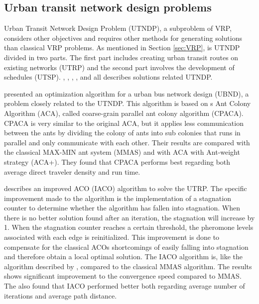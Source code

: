 \subsection{Urban transit network design problems}
\label{subsec:relatedWorkUTNDP}

Urban Transit Network Design Problem (UTNDP), a subproblem of VRP, considers other objectives and requires other methods for generating solutions than classical VRP problems. As mentioned in Section \vref{sec:VRP}, is UTNDP divided in two parts. The first part includes creating urban transit routes on existing networks (UTRP) and the second part involves the development of schedules (UTSP). \citet{yang07}, \citet{jiang10}, \citet{poorzahedy11}, \citet{nikolic14}, and \citet{kechagiopoulos14} all describes solutions related UTNDP. %

\citet{yang07} presented an optimization algorithm for a urban bus network design (UBND), a problem closely related to the UTNDP. This algorithm is based on \citet{dorigo96}s Ant Colony Algorithm (ACA), called coarse-grain parallel ant colony algorithm (CPACA). CPACA is very similar to the original ACA, but it applies less communication between the ants by dividing the colony of ants into sub colonies that runs in parallel and only communicate with each other. Their results are compared with the classical MAX-MIN ant system (MMAS)\citep{stutzle99} and with ACA with Ant-weight strategy (ACA+). They found that CPACA performs best regarding both average direct traveler density and run time. 

\citet{jiang10} describes an improved ACO (IACO) algorithm to solve the UTRP. The specific improvement made to the algorithm is the implementation of a stagnation counter to determine whether the algorithm has fallen into stagnation. When there is no better solution found after an iteration, the stagnation will increase by 1. When the stagnation counter reaches a certain threshold, the pheromone levels associated with each edge is reinitialized. This improvement is done to compensate for the classical ACOs shortcomings of easily falling into stagnation and therefore obtain a local optimal solution. The IACO algorithm is, like the algorithm described by \citet{yang07}, compared to the classical MMAS algorithm. The results shows significant improvement to the convergence speed compared to MMAS. The also found that IACO performed better both regarding average number of iterations and average path distance. 

